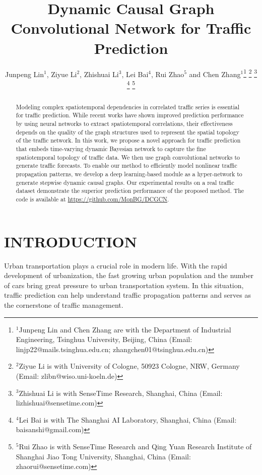 \documentclass[letterpaper, 10 pt, conference]{ieeeconf}
\title{\LARGE \bf
Dynamic Causal Graph Convolutional Network for Traffic Prediction
}
\author{Junpeng Lin$^{1}$, Ziyue Li$^{2}$, Zhishuai Li$^{3}$, Lei Bai$^{4}$, Rui Zhao$^{5}$ and Chen Zhang$^{1}$\thanks{$^{1}$Junpeng Lin and Chen Zhang are with the Department of Industrial Engineering, Tsinghua University, Beijing, China (Email: linjp22@mails.tsinghua.edu.cn; zhangchen01@tsinghua.edu.cn)}
\thanks{$^{2}$Ziyue Li is with University of Cologne, 50923 Cologne, NRW, Germany (Email: zlibn@wiso.uni-koeln.de)}
\thanks{$^{3}$Zhishuai Li is with SenseTime Research, Shanghai, China (Email: lizhishuai@sensetime.com)}
\thanks{$^{4}$Lei Bai is with The Shanghai AI Laboratory, Shanghai, China (Email: baisanshi@gmail.com)}
\thanks{$^{5}$Rui Zhao is with SenseTime Research and Qing Yuan Research Institute of Shanghai Jiao Tong University, Shanghai, China (Email: zhaorui@sensetime.com)}
}
\begin{document}
\maketitle
\thispagestyle{empty}
\pagestyle{empty}




\begin{abstract}



Modeling complex spatiotemporal dependencies in correlated traffic series is essential for traffic prediction. While recent works have shown improved prediction performance by using neural networks to extract spatiotemporal correlations, their effectiveness depends on the quality of the graph structures used to represent the spatial topology of the traffic network. In this work, we propose a novel approach for traffic prediction that embeds time-varying dynamic Bayesian network to capture the fine spatiotemporal topology of traffic data. We then use graph convolutional networks to generate traffic forecasts. To enable our method to efficiently model nonlinear traffic propagation patterns, we develop a deep learning-based module as a hyper-network to generate stepwise dynamic causal graphs. Our experimental results on a real traffic dataset demonstrate the superior prediction performance of the proposed method. The code is available at \url{https://github.com/MonBG/DCGCN}.

\end{abstract}


\section{INTRODUCTION}










Urban transportation plays a crucial role in modern life. With the rapid development of urbanization, the fast growing urban population and the number of cars bring great pressure to urban transportation system. In this situation, traffic prediction can help understand traffic propagation patterns and serves as the cornerstone of traffic management. 
\end{document}
